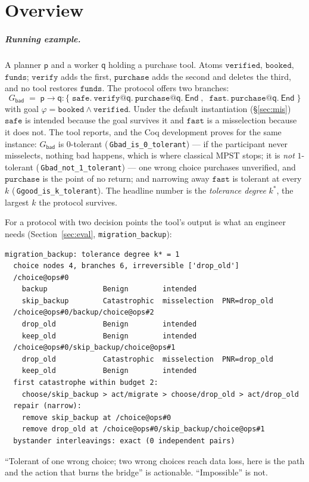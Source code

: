 \documentclass[a4paper,UKenglish,cleveref,autoref,thm-restate,anonymous]{lipics-v2021}
\newcommand{\id}[1]{\texttt{#1}}
\newcommand{\End}{\mathsf{End}}
\newcommand{\coqok}[1]{\textcolor{okgreen}{\ding{51}}\,\texttt{\small #1}}
\newcommand{\kstar}{k^{*}}
\begin{document}
\section{Overview}\label{sec:overview}

\subparagraph*{Running example.}
A planner $\mathsf p$ and a worker $\mathsf q$ holding a purchase tool. Atoms
$\id{verified}$, $\id{booked}$, $\id{funds}$; $\id{verify}$ adds the first,
$\id{purchase}$ adds the second and deletes the third, and no tool restores
$\id{funds}$. The protocol offers two branches:
\[
G_{\mathsf{bad}} \;=\;
\mathsf p{\to}\mathsf q : \bigl\{\;
  \id{safe}.\ \id{verify}@\mathsf q.\ \id{purchase}@\mathsf q.\ \End
  \;,\;\;
  \id{fast}.\ \id{purchase}@\mathsf q.\ \End \;\bigr\}
\]
with goal $\varphi = \id{booked}\wedge\id{verified}$.
Under the default instantiation (\S\ref{sec:mis}) $\id{safe}$ is intended
because the goal survives it and $\id{fast}$ is a misselection because it does
not. The tool reports, and the Coq development proves for the same instance:
$G_{\mathsf{bad}}$ is $0$-tolerant (\coqok{Gbad\_is\_0\_tolerant}) --- if the
participant never misselects, nothing bad happens, which is where classical
MPST stops; it is \emph{not} $1$-tolerant (\coqok{Gbad\_not\_1\_tolerant}) ---
one wrong choice purchases unverified, and $\id{purchase}$ is the point of no
return; and narrowing away $\id{fast}$ is tolerant at every $k$
(\coqok{Ggood\_is\_k\_tolerant}). The headline number is the \emph{tolerance
degree} $\kstar$, the largest $k$ the protocol survives.

For a protocol with two decision points the tool's output is what an engineer
needs (Section~\ref{sec:eval}, \texttt{migration\_backup}):
{\footnotesize
\begin{verbatim}
migration_backup: tolerance degree k* = 1
  choice nodes 4, branches 6, irreversible ['drop_old']
  /choice@ops#0
    backup             Benign        intended
    skip_backup        Catastrophic  misselection  PNR=drop_old
  /choice@ops#0/backup/choice@ops#2
    drop_old           Benign        intended
    keep_old           Benign        intended
  /choice@ops#0/skip_backup/choice@ops#1
    drop_old           Catastrophic  misselection  PNR=drop_old
    keep_old           Benign        intended
  first catastrophe within budget 2:
    choose/skip_backup > act/migrate > choose/drop_old > act/drop_old
  repair (narrow):
    remove skip_backup at /choice@ops#0
    remove drop_old at /choice@ops#0/skip_backup/choice@ops#1
  bystander interleavings: exact (0 independent pairs)
\end{verbatim}}
``Tolerant of one wrong choice; two wrong choices reach data loss, here is the
path and the action that burns the bridge'' is actionable. ``Impossible'' is
not.
\end{document}

